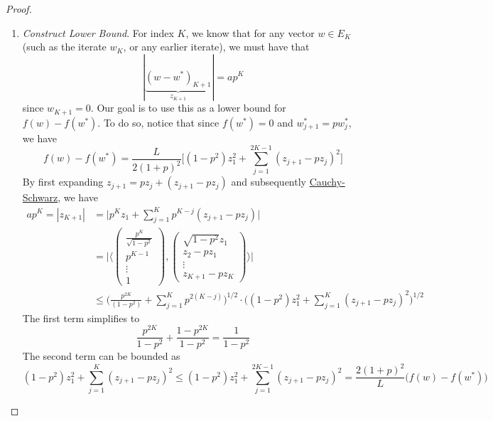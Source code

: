 \begin{proof}
\begin{enumerate}
			\item \textit{Construct Lower Bound}. For index $K$, we know that for any vector $w \in E_{K}$ (such as the iterate $w_K$, or any earlier iterate), we must have that 
				\begin{equation}
					|\underbrace{(w - w^\ast)_{K+1}}_{z_{K+1}}| = a p^K
				\end{equation} 
				since $w_{K+1} = 0$. Our goal is to use this as a lower bound for $f(w) - f(w^\ast)$. To do so, notice that since $f(w^\ast) = 0$ and $w_{j+1}^\ast = p w_j^\ast$, we have 
				\begin{equation}
					f(w) - f(w^\ast) = \frac{L}{2 (1 + p)^2} \bigg[ (1 - p^2) z_1^2 + \sum_{j=1}^{2K - 1} (z_{j+1} - p z_j )^2 \bigg] 
				\end{equation}
				By first expanding $z_{j+1} = p z_j + (z_{j+1} - p z_j)$ and subsequently \hyperref[lin-thm:cauchy-schwarz-inequality]{Cauchy-Schwarz}, we have 
				\begin{align}
					a p^K = |z_{K+1}| & = \bigg| p^K z_1 + \sum_{j=1}^K p^{K - j} (z_{j+1} - p z_j) \bigg| \\ 
								& = \bigg| \bigg\langle \begin{pmatrix} \frac{p^K}{\sqrt{1 - p^2}} \\ p^{K-1} \\ \vdots \\ 1 \end{pmatrix} , \begin{pmatrix} \sqrt{1 - p^2} z_1 \\ z_2 - p z_1 \\ \vdots \\ z_{K+1} - p z_K \end{pmatrix} \bigg\rangle \bigg| \\ 
								& \leq \bigg( \frac{p^{2K}}{(1 - p^2)} + \sum_{j=1}^K p^{2 (K - j)}\bigg)^{1/2} \cdot \bigg( (1 - p^2) z_1^2 + \sum_{j=1}^K (z_{j+1} - p z_j)^2 \bigg)^{1/2} 
				\end{align}
				The first term simplifies to 
				\begin{equation}
					\frac{p^{2K}}{1 - p^2} + \frac{1 - p^{2K}}{1 - p^2} = \frac{1}{1 - p^2} 
				\end{equation}
				The second term can be bounded as 
				\begin{equation}
					(1 - p^2) z_1^2 + \sum_{j=1}^K (z_{j+1} - p z_j)^2  \leq (1 - p^2) z_1^2 + \sum_{j=1}^{2K-1} (z_{j+1} - p z_j)^2 = \frac{2(1 + p)^2}{L} \big( f(w) - f(w^\ast) \big) 
				\end{equation}

\end{enumerate}
\end{proof}
